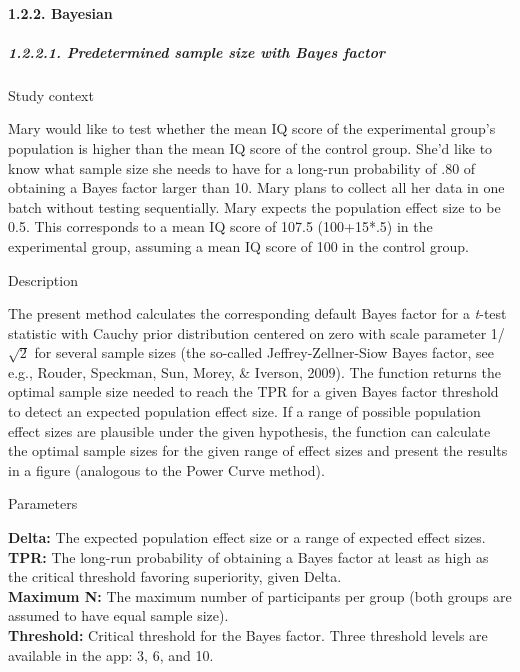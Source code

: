 \documentclass[
  english,
  man,floatsintext]{apa6}
\let\oldparagraph\paragraph
\renewcommand{\paragraph}[1]{\oldparagraph{#1}\mbox{}}
\let\oldsubparagraph\subparagraph
\renewcommand{\subparagraph}[1]{\oldsubparagraph{#1}\mbox{}}
\begin{document}
\hypertarget{bayesian}{%
\paragraph{1.2.2. Bayesian}\label{bayesian}}

\hypertarget{predetermined-sample-size-with-bayes-factor}{%
\subparagraph{1.2.2.1. Predetermined sample size with Bayes factor}\label{predetermined-sample-size-with-bayes-factor}}

Study context

Mary would like to test whether the mean IQ score of the experimental group's population is higher than the mean IQ score of the control group. She'd like to know what sample size she needs to have for a long-run probability of .80 of obtaining a Bayes factor larger than 10. Mary plans to collect all her data in one batch without testing sequentially. Mary expects the population effect size to be 0.5. This corresponds to a mean IQ score of 107.5 (100+15*.5) in the experimental group, assuming a mean IQ score of 100 in the control group.

Description

The present method calculates the corresponding default Bayes factor for a \emph{t}-test statistic with Cauchy prior distribution centered on zero with scale parameter 1/\(\sqrt{2}\) for several sample sizes (the so-called Jeffrey-Zellner-Siow Bayes factor, see e.g., Rouder, Speckman, Sun, Morey, \& Iverson, 2009). The function returns the optimal sample size needed to reach the TPR for a given Bayes factor threshold to detect an expected population effect size. If a range of possible population effect sizes are plausible under the given hypothesis, the function can calculate the optimal sample sizes for the given range of effect sizes and present the results in a figure (analogous to the Power Curve method).

Parameters

\textbf{Delta:} The expected population effect size or a range of expected effect sizes.\\
\textbf{TPR:} The long-run probability of obtaining a Bayes factor at least as high as the critical threshold favoring superiority, given Delta.\\
\textbf{Maximum N:} The maximum number of participants per group (both groups are assumed to have equal sample size).\\
\textbf{Threshold:} Critical threshold for the Bayes factor. Three threshold levels are available in the app: 3, 6, and 10.\\
\end{document}
